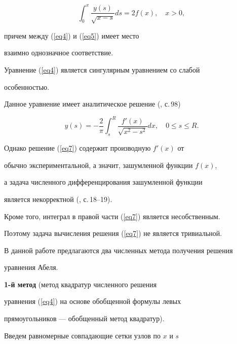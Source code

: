 \begin{equation}


\label{eq5}


\int_0^x\frac{y(s)}{\sqrt{x-s}}ds=2f(x),\quad x>0,


\end{equation}


причем между (\ref{eq4}) и (\ref{eq5}) имеет место


взаимно однозначное соответствие.





Уравнение (\ref{eq4}) является сингулярным уравнением со слабой


особенностью.


Данное уравнение имеет аналитическое решение (\cite{siz}, с.\,98)


\begin{equation}


\label{eq7}


y(s)=-\frac2{\pi}\int_s^R\frac{f'(x)}{\sqrt{x^2-s^2}}dx,


\quad 0\le s\le R.


\end{equation}





Однако решение (\ref{eq7}) содержит производную $f'(x)$ от


обычно экспериментальной, а значит, зашумленной функции $f(x)$,


а задача численного дифференцирования зашумленной функции


является некорректной (\cite{ta}, с.\,18--19).


Кроме того, интеграл в правой части (\ref{eq7}) является несобственным.


Поэтому задача вычисления решения (\ref{eq7}) не является тривиальной.


В данной работе предлагаются два численных метода получения решения


уравнения Абеля. 


\medskip





{\bf 1-й метод} (метод квадратур численного решения


уравнения (\ref{eq4}) на основе обобщенной формулы левых


прямоугольников --- обобщенный метод квадратур).


Введем равномерные совпадающие сетки узлов по $x$ и $s$


